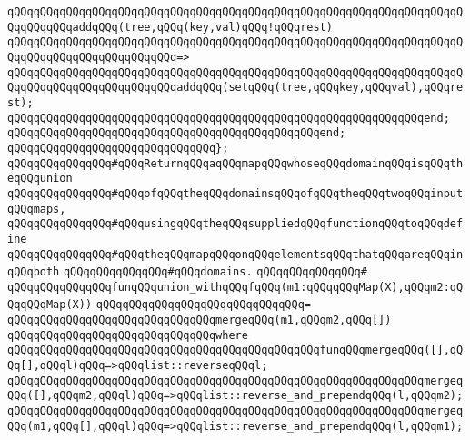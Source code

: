 \newline
\verb|qQQqqQQqqQQqqQQqqQQqqQQqqQQqqQQqqQQqqQQqqQQqqQQqqQQqqQQqqQQqqQQqqQQqqQQqqQQqqQQqaddqQQq(tree,qQQq(key,val)qQQq!qQQqrest)|\newline
\verb|qQQqqQQqqQQqqQQqqQQqqQQqqQQqqQQqqQQqqQQqqQQqqQQqqQQqqQQqqQQqqQQqqQQqqQQqqQQqqQQqqQQqqQQqqQQqqQQq=>|\newline
\verb|qQQqqQQqqQQqqQQqqQQqqQQqqQQqqQQqqQQqqQQqqQQqqQQqqQQqqQQqqQQqqQQqqQQqqQQqqQQqqQQqqQQqqQQqqQQqqQQqaddqQQq(setqQQq(tree,qQQqkey,qQQqval),qQQqrest);|\newline
\verb|qQQqqQQqqQQqqQQqqQQqqQQqqQQqqQQqqQQqqQQqqQQqqQQqqQQqqQQqqQQqqQQqend;|\newline
\verb|qQQqqQQqqQQqqQQqqQQqqQQqqQQqqQQqqQQqqQQqqQQqqQQqend;|\newline
\verb|qQQqqQQqqQQqqQQqqQQqqQQqqQQqqQQq};|\newline
\newline
\verb|qQQqqQQqqQQqqQQq#qQQqReturnqQQqaqQQqmapqQQqwhoseqQQqdomainqQQqisqQQqtheqQQqunion|\newline
\verb|qQQqqQQqqQQqqQQq#qQQqofqQQqtheqQQqdomainsqQQqofqQQqtheqQQqtwoqQQqinputqQQqmaps,|\newline
\verb|qQQqqQQqqQQqqQQq#qQQqusingqQQqtheqQQqsuppliedqQQqfunctionqQQqtoqQQqdefine|\newline
\verb|qQQqqQQqqQQqqQQq#qQQqtheqQQqmapqQQqonqQQqelementsqQQqthatqQQqareqQQqinqQQqboth|\newline
\verb|qQQqqQQqqQQqqQQq#qQQqdomains.|\newline
\verb|qQQqqQQqqQQqqQQq#|\newline
\verb|qQQqqQQqqQQqqQQqfunqQQqunion_withqQQqfqQQq(m1:qQQqqQQqMap(X),qQQqm2:qQQqqQQqMap(X))|\newline
\verb|qQQqqQQqqQQqqQQqqQQqqQQqqQQqqQQq=|\newline
\verb|qQQqqQQqqQQqqQQqqQQqqQQqqQQqqQQqmergeqQQq(m1,qQQqm2,qQQq[])|\newline
\verb|qQQqqQQqqQQqqQQqqQQqqQQqqQQqqQQqwhere|\newline
\verb|qQQqqQQqqQQqqQQqqQQqqQQqqQQqqQQqqQQqqQQqqQQqqQQqfunqQQqmergeqQQq([],qQQq[],qQQql)qQQq=>qQQqlist::reverseqQQql;|\newline
\verb|qQQqqQQqqQQqqQQqqQQqqQQqqQQqqQQqqQQqqQQqqQQqqQQqqQQqqQQqqQQqqQQqmergeqQQq([],qQQqm2,qQQql)qQQq=>qQQqlist::reverse_and_prependqQQq(l,qQQqm2);|\newline
\verb|qQQqqQQqqQQqqQQqqQQqqQQqqQQqqQQqqQQqqQQqqQQqqQQqqQQqqQQqqQQqqQQqmergeqQQq(m1,qQQq[],qQQql)qQQq=>qQQqlist::reverse_and_prependqQQq(l,qQQqm1);|\newline
